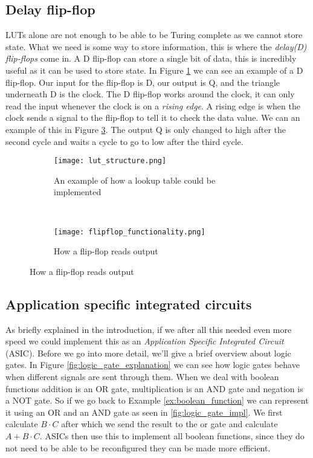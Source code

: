 \subsection{Delay flip-flop}
LUTs alone are not enough to be able to be Turing complete as we cannot store
state. What we need is some way to store information, this is where the
\textit{delay(D) flip-flops} come in. A D flip-flop can store a single bit of
data, this is incredibly useful as it can be used to store state. In Figure
\ref{fig:lut_flipflop} we can see an example of a D flip-flop. Our input for
the flip-flop is D, our output is Q, and the triangle underneath D is the
clock. The D flip-flop works around the clock, it can only read the input
whenever the clock is on a \textit{rising edge}. A rising edge is when the
clock sends a signal to the flip-flop to tell it to check the data value. We
can an example of this in Figure \ref{fig:flipflop_func}. The output Q is only
changed to high after the second cycle and waits a cycle to go to low after the
third cycle.

\begin{figure}[H]
    \begin{subfigure}[b]{.4\textwidth}
        \centering
        \texttt{[image: lut\_structure.png]}
        \caption{An example of how a lookup table could be implemented}
        \label{fig:lut_flipflop}
    \end{subfigure}
    ~
    \centering
    \begin{subfigure}[b]{.4\textwidth}
        \centering
        \texttt{[image: flipflop\_functionality.png]}
        \caption{How a flip-flop reads output}
        \label{fig:flipflop_func}
    \end{subfigure}
\end{figure}

\subsection{Application specific integrated circuits}
As briefly explained in the introduction, if we after all this needed even more
speed we could implement this as an \textit{Application Specific Integrated
Circuit} (ASIC). Before we go into more detail, we'll give a brief overview
about logic gates. In Figure \ref{fig:logic_gate_explanation} we can see how
logic gates behave when different signals are sent through them. When we deal
with boolean functions addition is an OR gate, multiplication is an AND gate
and negation is a NOT gate. So if we go back to Example
\ref{ex:boolean_function} we can represent it using an OR and an AND gate as
seen in \ref{fig:logic_gate_impl}. We first calculate $B \cdot C$ after which
we send the result to the or gate and calculate $A + B \cdot C$. ASICs then use
this to implement all boolean functions, since they do not need to be able
to be reconfigured they can be made more efficient.

